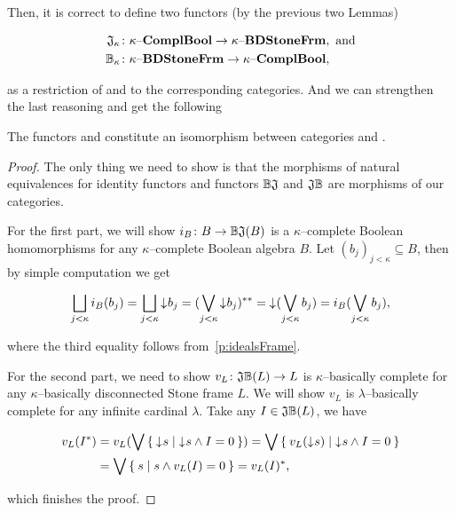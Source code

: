 Then, it is correct to define two functors (by the previous two Lemmas)

\begin{align*}
    \mathfrak{J}_{\kappa}&\colon \kappa\text{--}\mathbf{ComplBool} \to \kappa\text{--}\mathbf{BDStoneFrm}, \text{ and} \\
    \mathbb{B}_{\kappa}&\colon \kappa\text{--}\mathbf{BDStoneFrm} \to \kappa\text{--}\mathbf{ComplBool},
\end{align*}

\noindent as a restriction of \JO{} and \BcO{} to the corresponding categories. And we can strengthen the last reasoning and get the following

\begin{theorem*}\label{p:kappaDuality}
    The functors \JK{} and \BcK{} constitute an isomorphism between categories \kComplBool{} and \kBDStoneFrm.
\end{theorem*}
\begin{proof}
    The only thing we need to show is that the morphisms of natural equivalences for identity functors and functors $\mathbb{B}\mathfrak{J}$ and $\mathfrak{J}\mathbb{B}$ are morphisms of our categories.

    For the first part, we will show $i_B\colon B \to \mathbb{B}\mathfrak{J}(B)$ is a $\kappa$--complete Boolean homomorphisms for any $\kappa$--complete Boolean algebra $B$. Let $(b_j)_{j < \kappa} \subseteq B$, then by simple computation we get

    $$
        \bigsqcup_{j < \kappa} i_B(b_j) = \bigsqcup_{j < \kappa} \mathord{\downarrow}\mkern1mu b_j = (\bigvee_{j < \kappa} \mathord{\downarrow}\mkern1mu b_j)^{**} = \mathord{\downarrow}\mkern1mu (\bigvee_{j < \kappa} b_j) = i_B(\bigvee_{j < \kappa} b_j),
    $$

    \noindent where the third equality follows from~\ref{p:idealsFrame}.

    For the second part, we need to show $v_L\colon \mathfrak{J}\mathbb{B}(L) \to L$ is $\kappa$--basically complete for any $\kappa$--basically disconnected Stone frame $L$. We will show $v_L$ is $\lambda$--basically complete for any infinite cardinal $\lambda$. Take any $I \in \mathfrak{J}\mathbb{B}(L)$, we have

    \begin{align*}
        v_L(I^*) &= v_L(\bigvee \Set{ \mathord{\downarrow}\mkern1mus | \mathord{\downarrow}\mkern1mus \wedge I = 0 })
                  = \bigvee \Set{ v_L(\mathord{\downarrow}\mkern1mus) | \mathord{\downarrow}\mkern1mus \wedge I = 0 } \\
                 &= \bigvee \Set{ s | s \wedge v_L(I) = 0 } = v_L(I)^*,
    \end{align*}

    \noindent which finishes the proof.
\end{proof}

